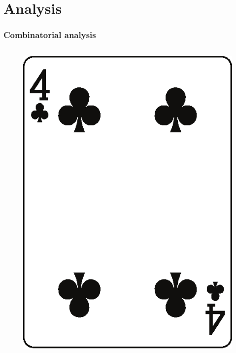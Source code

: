\documentclass[10pt]{beamer}
\begin{document}
\section{Analysis}
\begin{frame}
\frametitle{Combinatorial analysis}
 \begin{columns}
  \begin{column}{3cm}
   \begin{figure}
    \includegraphics[width=\linewidth]{im/clubs_4.eps}
   \end{figure}
  \end{column}
  

\end{columns}
\end{frame}
\end{document}
